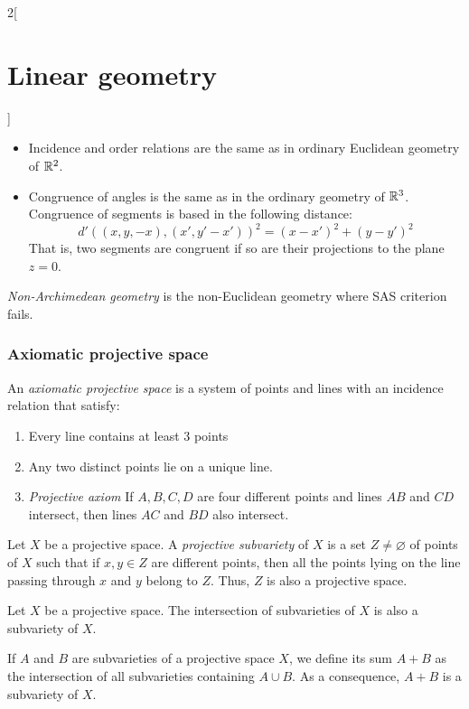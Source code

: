 \documentclass[../../../main_math.tex]{subfiles}
\begin{document}
\begin{multicols}{2}[\section{Linear geometry}]
\begin{proposition}
\begin{itemize}
      \item Incidence and order relations are the same as in ordinary Euclidean geometry of $\mathbb{R}^2$.
      \item Congruence of angles is the same as in the ordinary geometry of $\mathbb{R}^3$. Congruence of segments is based in the following distance:  $${d'((x,y,-x),(x',y'-x'))}^2=(x-x')^2+{(y-y')}^2$$ That is, two segments are congruent if so are their projections to the plane $z=0$.
    \end{itemize}
  \end{proposition}
  \begin{definition}
    \emph{Non-Archimedean geometry} is the non-Euclidean geometry where SAS criterion fails.
  \end{definition}
  \subsubsection{Axiomatic projective space}
  \begin{definition}
    An \emph{axiomatic projective space} is a system of points and lines with an incidence relation that satisfy:
    \begin{enumerate}
      \item Every line contains at least 3 points
      \item Any two distinct points lie on a unique line.
      \item \emph{Projective axiom} If $A,B,C,D$ are four different points and lines $AB$ and $CD$ intersect, then lines $AC$ and $BD$ also intersect.
    \end{enumerate}
  \end{definition}
  \begin{definition}
    Let $X$ be a projective space. A \emph{projective subvariety} of $X$ is a set $Z\ne\varnothing$ of points of $X$ such that if $x,y\in Z$ are different points, then all the points lying on the line passing through $x$ and $y$ belong to $Z$. Thus, $Z$ is also a projective space.
  \end{definition}
  \begin{proposition}
    Let $X$ be a projective space. The intersection of subvarieties of $X$ is also a subvariety of $X$.
  \end{proposition}
  \begin{proposition}
    If $A$ and $B$ are subvarieties of a projective space $X$, we define its sum $A+B$ as the intersection of all subvarieties containing $A\cup B$. As a consequence, $A+B$ is a subvariety of $X$.

\end{proposition}
\end{multicols}
\end{document}
